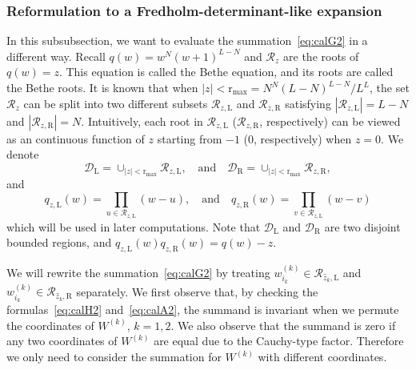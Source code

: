 \documentclass{article}
\numberwithin{equation}{section}
\newcommand{\LL}{\mathrm{L}}
\newcommand{\RR}{\mathrm{R}}
\newcommand{\rr}{\mathrm{r_{max}}}
\begin{document}
\subsubsection{Reformulation to a Fredholm-determinant-like expansion}

In this subsubsection, we want to evaluate the summation~\eqref{eq:calG2} in a different way. Recall $q(w)=w^N(w+1)^{L-N}$ and $\mathcal{R}_z$ are the roots of $q(w)=z$. This equation is called the Bethe equation, and its roots are called the Bethe roots. It is known \cite{Baik-Liu16} that when $|z|< \rr= N^N (L-N)^{L-N}/L^L$, the set $\mathcal{R}_z$ can be split into two different subsets $\mathcal{R}_{z,\LL}$ and $\mathcal{R}_{z,\RR}$ satisfying $|\mathcal{R}_{z,\LL}|=L-N$ and $|\mathcal{R}_{z,\RR}|=N$. Intuitively, each root in $\mathcal{R}_{z,\LL}$ ($\mathcal{R}_{z,\RR}$, respectively) can be viewed as an continuous function of $z$ starting from $-1$ ($0$, respectively) when $z=0$. We denote
\begin{equation}
	\mathcal{D}_{\LL} = \cup_{|z|<\rr} \mathcal{R}_{z,\LL},\quad \text{and}\quad
	\mathcal{D}_{\RR} = \cup_{|z|<\rr} \mathcal{R}_{z,\RR},
\end{equation}
and
\begin{equation}
	q_{z,\LL} (w)= \prod_{u\in\mathcal{R}_{z,\LL}} (w-u),\quad \text{and}\quad 
	q_{z,\RR} (w)= \prod_{v\in\mathcal{R}_{z,\LL}} (w-v)
\end{equation}
which will be used in later computations. Note that $\mathcal{D}_{\LL}$ and $\mathcal{D}_{\RR}$ are two disjoint bounded regions, and $q_{z,\LL}(w)q_{z,\RR}(w)=q(w)-z$.

We will rewrite the summation~\eqref{eq:calG2} by treating $w_{i_k}^{(k)}\in\mathcal{R}_{\hat z_k,\LL}$ and $w_{i_k}^{(k)}\in\mathcal{R}_{\hat z_k,\RR}$ separately. We first observe that, by checking the formulas~\eqref{eq:calH2} and~\eqref{eq:calA2}, the summand is invariant when we permute the coordinates of $W^{(k)}$, $k=1,2$. We also observe that the summand is zero if any two coordinates of $W^{(k)}$ are equal due to the Cauchy-type factor. Therefore we only need to consider the summation for $W^{(k)}$ with different coordinates.
\end{document}
